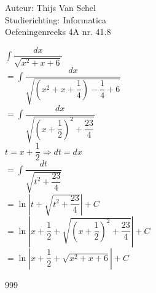 \documentclass[a4paper]{article}
\newcommand{\dint}{\displaystyle\int}
\begin{document}
  
\noindent \large Auteur: Thijs Van Schel \\
\noindent \large Studierichting: Informatica\\
\noindent \large Oefeningenreeks 4A nr. 41.8\\

\medskip

\normalsize

$\dint \dfrac{dx}{\sqrt{x^2+x+6}}$ \\

$= \dint \dfrac{dx}{\sqrt{(x^2+x+\dfrac{1}{4}) - \dfrac{1}{4} + 6}}$ \\

$= \dint \dfrac{dx}{\sqrt{(x+\dfrac{1}{2})^2 + \dfrac{23}{4}}}$ \\

$t = x+\dfrac{1}{2} \Rightarrow dt = dx$ \\

$= \dint \dfrac{dt}{\sqrt{t^2 + \dfrac{23}{4}}}$ \\

$= \ln \left| t + \sqrt{t^2 + \dfrac{23}{4}} \right| + C$ \\

$= \ln \left| x + \dfrac{1}{2} + \sqrt{(x+\dfrac{1}{2})^2 + \dfrac{23}{4}} \right| + C$ \\

$= \ln \left| x + \dfrac{1}{2} + \sqrt{x^2+x+6} \right| + C$

\begin{thebibliography}{999}
\end{thebibliography}
\end{document}
